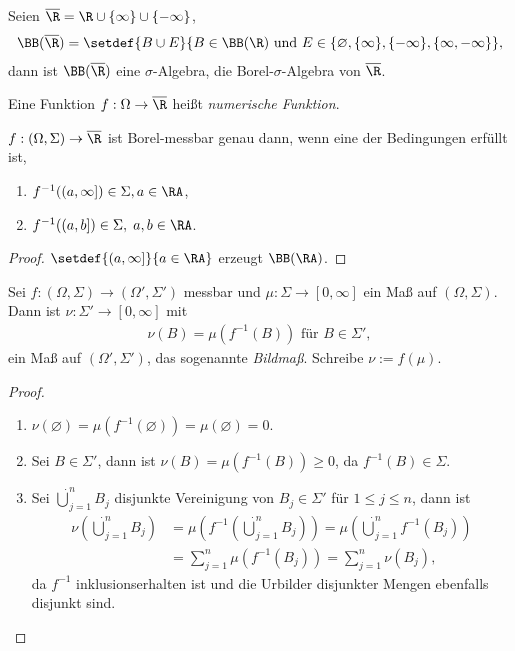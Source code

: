 \begin{prop}
\label{prop:3.19}
Seien $\overline{\R} = \R\cup\{\infty\}\cup\{-\infty\}$,
\begin{align*}
\BB(\overline{\R}) = \setdef{B\cup E}{B\in\BB(\R)\text{ und }
E\in\{\varnothing, \{\infty\}, \{-\infty\}, \{\infty,-\infty\}},
\end{align*}
dann ist $\BB(\overline{\R})$ eine $\sigma$-Algebra, die Borel-$\sigma$-Algebra
von $\overline{\R}$.

Eine Funktion $f: \Omega\to\overline{\R}$ heißt \emph{numerische
Funktion}.\fishhere
\end{prop}

\begin{cor}
\label{prop:3.20}
$f: (\Omega,\Sigma)\to\overline{\R}$ ist Borel-messbar genau dann, wenn eine
der Bedingungen erfüllt ist,
\begin{enumerate}[label=(\roman{*})]
  \item $f^{-1}((a,\infty])\in\Sigma, a\in\RA$,
  \item $f^{-1}((a,b])\in\Sigma,\; a,b\in\RA$.\fishhere
\end{enumerate}
\end{cor}
\begin{proof}
$\setdef{(a,\infty]}{a\in\RA}$ erzeugt $\BB(\RA)$.\qedhere
\end{proof}

\begin{prop}[Bildmaß]
\label{prop:3.21}
Sei $f:(\Omega,\Sigma)\to(\Omega',\Sigma')$ messbar und $\mu:
\Sigma\to[0,\infty]$ ein Maß auf $(\Omega,\Sigma)$. Dann ist $\nu:
\Sigma'\to[0,\infty]$ mit
\begin{align*}
\nu(B) = \mu(f^{-1}(B)) \text{ für } B\in\Sigma',
\end{align*}
ein Maß auf $(\Omega',\Sigma')$, das sogenannte \emph{Bildmaß}. Schreibe
$\nu:=f(\mu)$.\fishhere
\end{prop}
\begin{proof}
\begin{enumerate}[label=(\roman{*})]
  \item $\nu(\varnothing) = \mu(f^{-1}(\varnothing)) = \mu(\varnothing) = 0$.
  \item Sei $B\in\Sigma'$, dann ist $\nu(B) = \mu(f^{-1}(B)) \ge 0$, da
  $f^{-1}(B)\in\Sigma$.
  \item Sei $\dot{\bigcup}_{j=1}^n B_j$ disjunkte Vereinigung von
  $B_j\in\Sigma'$ für $1\le j\le n$, dann ist
  \begin{align*}
  \nu\left(\dot{\bigcup}_{j=1}^n B_j \right)
  &= \mu\left(f^{-1}\left(\dot{\bigcup}_{j=1}^n B_j \right)\right)
  = \mu\left(\dot{\bigcup}_{j=1}^n f^{-1}(B_j)\right)
  \\ &= \sum\limits_{j=1}^n \mu\left(f^{-1}(B_j)\right) = \sum\limits_{j=1}^n
  \nu(B_j),
  \end{align*}
da $f^{-1}$ inklusionserhalten ist und die Urbilder disjunkter Mengen ebenfalls
disjunkt sind.\qedhere
\end{enumerate}
\end{proof}

